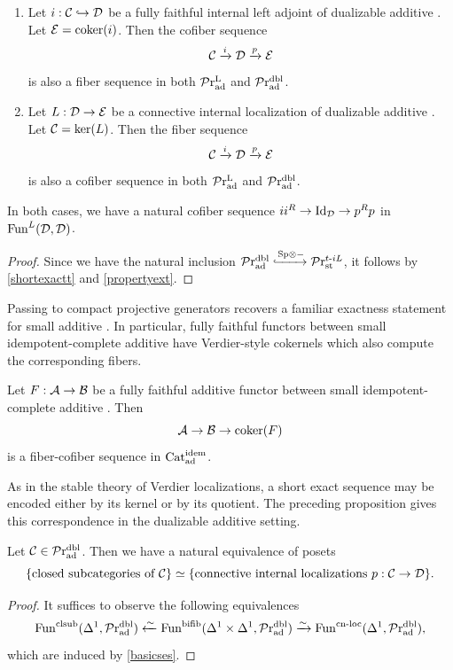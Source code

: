 \documentclass[a4paper,10pt, oneside]{amsart}
\begin{document}
	\begin{prop}\label{basicses}
		
		\begin{enumerate}
		
			\item 	Let $i:\mathcal{C}\hookrightarrow\mathcal{D}$ be a fully faithful internal left adjoint of dualizable additive \infcats. Let $\mathcal{E}=\mathrm{coker}(i)$. Then  the cofiber sequence $$\mathcal{C}\xrightarrow{i}\mathcal{D}\xrightarrow{p}\mathcal{E}$$ is also a fiber sequence in both $\mathcal{P}\mathrm{r}_{\mathrm{ad}}^\mathrm{L}$ and $\mathcal{P}\mathrm{r}_{\mathrm{ad}}^{\mathrm{dbl}}$.
			\item 	Let $L:\mathcal{D}\to\mathcal{E}$ be a connective internal localization of dualizable additive \infcats.  Let $\mathcal{C}=\ker(L)$. Then  the fiber sequence $$\mathcal{C}\xrightarrow{i}\mathcal{D}\xrightarrow{p}\mathcal{E}$$ is also a cofiber sequence in both $\mathcal{P}\mathrm{r}_{\mathrm{ad}}^\mathrm{L}$ and $\mathcal{P}\mathrm{r}_{\mathrm{ad}}^{\mathrm{dbl}}$.
		\end{enumerate} 
	In both cases, we have a natural cofiber sequence $ii^R\to \mathrm{Id}_\mathcal{D}\to p^Rp$ in $\operatorname{Fun}^L(\mathcal{D},\mathcal{D})$.
	\end{prop}
	\begin{proof}
		Since we have the natural inclusion $\praddbl\xhookrightarrow{\opsp\otimes-}\prtil$, it follows by \cref{shortexactt} and \cref{propertyext}.
	\end{proof}
	Passing to compact projective generators recovers a familiar exactness statement for small additive \infcats. In particular, fully faithful functors between small idempotent-complete additive \infcats have Verdier-style cokernels which also compute the corresponding fibers.
	
	\begin{cor}\label{addkarseq}
		Let $F:\mathcal{A}\to\mathcal{B}$ be a fully faithful additive functor between small idempotent-complete additive \infcats. Then  $$\mathcal{A}\to\mathcal{B}\to\mathrm{coker}(F)$$ is a fiber-cofiber sequence in $\mathrm{Cat}_{\mathrm{ad}}^{\mathrm{idem}}$.
	\end{cor}
As in the stable theory of Verdier localizations, a short exact sequence may be encoded either by its kernel or by its quotient. The preceding proposition gives this correspondence in the dualizable additive setting.

	\begin{prop}\label{connlocandclosub}
		Let $\mathcal{C}\in\mathcal{P}\mathrm{r}_{\mathrm{ad}}^{\mathrm{dbl}}$. Then we have a natural equivalence of posets $$\{\text{closed subcategories of }\mathcal{C}\}\simeq\{\text{connective internal localizations }p:\mathcal{C}\to \mathcal{D}\} .$$
	\end{prop}
	\begin{proof}
		It suffices to observe the following equivalences
		$$\operatorname{Fun}^{\mathrm{clsub}}(\Delta^1,\mathcal{P}\mathrm{r}_{\mathrm{ad}}^{\mathrm{dbl}})\xleftarrow{\sim}\operatorname{Fun}^{\mathrm{bifib}}(\Delta^1\times\Delta^1,\mathcal{P}\mathrm{r}_{\mathrm{ad}}^{\mathrm{dbl}})\xrightarrow{\sim}\operatorname{Fun}^{\mathrm{cn}\text{-}\mathrm{loc}}(\Delta^1,\mathcal{P}\mathrm{r}_{\mathrm{ad}}^{\mathrm{dbl}}),$$
		which are induced by \cref{basicses}.
	\end{proof}
\end{document}
